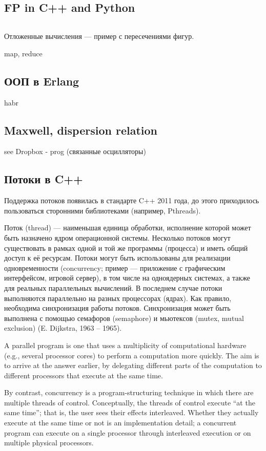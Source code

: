 \documentclass{book}
\begin{document}
\subsection{FP in C++ and Python}

\inputminted{cpp}{whyfpmatters.cpp}

Отложенные вычисления --- пример с пересечениями фигур.

map, reduce

\subsection{ООП в Erlang}

habr

\subsection{Maxwell, dispersion relation}

see Dropbox - prog (связанные осцилляторы)

\subsection{Потоки в C++}

Поддержка потоков появилась в стандарте C++ 2011 года, до этого приходилось
пользоваться сторонними библиотеками (например, Pthreads).

Поток (thread) --- наименьшая единица обработки, исполнение которой может быть
назначено ядром операционной системы. Несколько потоков могут существовать в
рамках одной и той же программы (процесса) и иметь общий доступ к её ресурсам.
Потоки могут быть использованы для реализации одновременности (concurrency;
пример --- приложение с графическим интерфейсом, игровой сервер), в том числе на одноядерных
системах, а также для реальных параллельных вычислений. В последнем случае
потоки выполняются параллельно на разных процессорах (ядрах). Как правило,
необходима синхронизация работы потоков. Синхронизация может быть выполнена с
помощью семафоров (semaphore) и мьютексов (mutex, mutual exclusion) (E.
Dijkstra, 1963 -- 1965).

A parallel program is one that uses a multiplicity of computational hardware (e.g., several
processor cores) to perform a computation more quickly. The aim is to arrive at the answer earlier,
by delegating different parts of the computation to different processors that execute at the same
time.

By contrast, concurrency is a program-structuring technique in which there are multiple threads of
control. Conceptually, the threads of control execute “at the same time”; that is, the user sees
their effects interleaved. Whether they actually execute at the same time or not is an
implementation detail; a concurrent program can execute on a single processor through interleaved
execution or on multiple physical processors.
\end{document}

